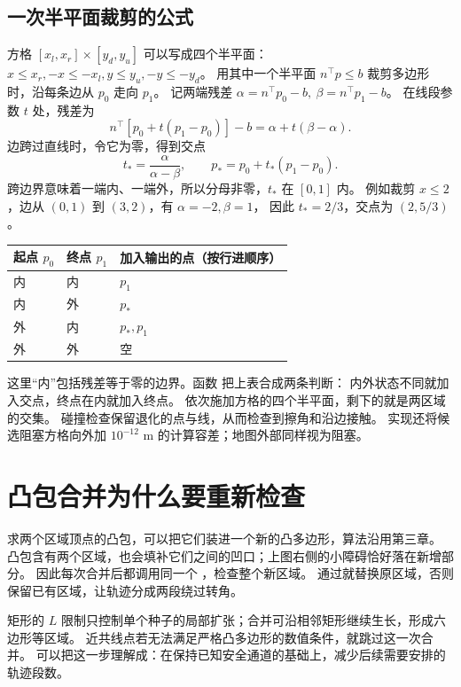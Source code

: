 \subsection{一次半平面裁剪的公式}
方格 $[x_l,x_r]\times[y_d,y_u]$ 可以写成四个半平面：
$x\leq x_r,-x\leq-x_l,y\leq y_u,-y\leq-y_d$。
用其中一个半平面 $n^\top p\leq b$ 裁剪多边形时，沿每条边从 $p_0$ 走向 $p_1$。
记两端残差 $\alpha=n^\top p_0-b,\ \beta=n^\top p_1-b$。
在线段参数 $t$ 处，残差为
\begin{equation}
n^\top[p_0+t(p_1-p_0)]-b
=\alpha+t(\beta-\alpha).
\end{equation}
边跨过直线时，令它为零，得到交点
\begin{equation}
t_* = \frac{\alpha}{\alpha-\beta},\qquad
p_*=p_0+t_*(p_1-p_0).
\end{equation}
跨边界意味着一端内、一端外，所以分母非零，$t_*$ 在 $[0,1]$ 内。
例如裁剪 $x\leq2$，边从 $(0,1)$ 到 $(3,2)$，有 $\alpha=-2,\beta=1$，
因此 $t_*=2/3$，交点为 $(2,5/3)$。

\begin{center}\small
\begin{tabular}{lll}\toprule
起点 $p_0$ & 终点 $p_1$ & 加入输出的点（按行进顺序）\\\midrule
内 & 内 & $p_1$\\
内 & 外 & $p_*$\\
外 & 内 & $p_*,p_1$\\
外 & 外 & 空\\\bottomrule
\end{tabular}
\end{center}
这里“内”包括残差等于零的边界。函数  把上表合成两条判断：
内外状态不同就加入交点，终点在内就加入终点。
依次施加方格的四个半平面，剩下的就是两区域的交集。
碰撞检查保留退化的点与线，从而检查到擦角和沿边接触。
实现还将候选阻塞方格向外加 $10^{-12}$ m 的计算容差；地图外部同样视为阻塞。

\section{凸包合并为什么要重新检查}
求两个区域顶点的凸包，可以把它们装进一个新的凸多边形，算法沿用第三章。
凸包含有两个区域，也会填补它们之间的凹口；上图右侧的小障碍恰好落在新增部分。
因此每次合并后都调用同一个 ，检查整个新区域。
通过就替换原区域，否则保留已有区域，让轨迹分成两段绕过转角。

矩形的 $L$ 限制只控制单个种子的局部扩张；合并可沿相邻矩形继续生长，形成六边形等区域。
近共线点若无法满足严格凸多边形的数值条件，就跳过这一次合并。
可以把这一步理解成：在保持已知安全通道的基础上，减少后续需要安排的轨迹段数。

